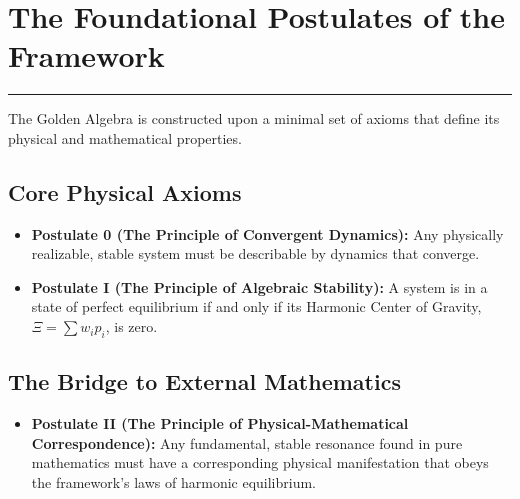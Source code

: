 \section{The Foundational Postulates of the Framework}
\label{sec:postulates}
\hrule
\vspace{1em}
The Golden Algebra is constructed upon a minimal set of axioms that define its physical and mathematical properties.

\subsection*{Core Physical Axioms}
\begin{itemize}
    \item \textbf{Postulate 0 (The Principle of Convergent Dynamics):} Any physically realizable, stable system must be describable by dynamics that converge.
    \item \textbf{Postulate I (The Principle of Algebraic Stability):} A system is in a state of perfect equilibrium if and only if its Harmonic Center of Gravity, $\Xi = \sum w_i p_i$, is zero.
\end{itemize}

\subsection*{The Bridge to External Mathematics}
\begin{itemize}
    \item \textbf{Postulate II (The Principle of Physical-Mathematical Correspondence):} Any fundamental, stable resonance found in pure mathematics must have a corresponding physical manifestation that obeys the framework's laws of harmonic equilibrium.
\end{itemize}